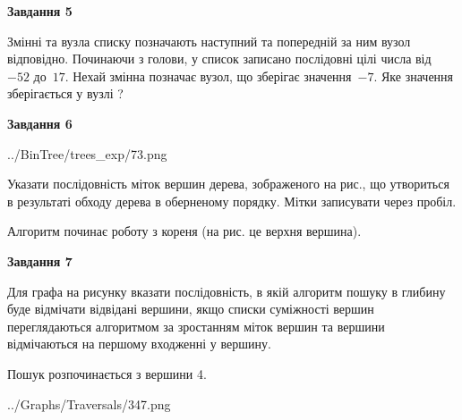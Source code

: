 \documentclass[12pt, ukrainian]{article}
\begin{document}
{\begin {large}
{\begin {center}\textbf{Завдання 5}\end {center}}\par
Змінні  та  вузла списку позначають наступний та попередній за ним вузол відповідно. Починаючи з голови, у список записано послідовні цілі числа від~$-52$ до~$17$. Нехай змінна  позначає вузол, що зберігає значення~$-7$.
Яке значення зберігається у вузлі  ?\par
\newpage

{\begin {center}\textbf{Завдання 6}\end {center}}\par

\begin{center}
	{../BinTree/trees_exp/73.png}
\end{center}
Указати послідовність міток вершин дерева, зображеного на рис., що утвориться в результаті обходу дерева в оберненому порядку. Мітки записувати через пробіл.\par Алгоритм починає роботу з кореня (на рис. це верхня вершина).\par
\newpage

{\begin {center}\textbf{Завдання 7}\end {center}}\par
Для графа на рисунку вказати послідовність, в якій алгоритм пошуку в глибину буде відмічати відвідані вершини, якщо списки суміжності вершин переглядаються алгоритмом за зростанням міток вершин та вершини відмічаються на першому вход\-женні у вершину.\par
Пошук розпочинається з вершини 4.\par

\begin{center}
	{../Graphs/Traversals/347.png}
\end{center}\par
\newpage


\end{large}}
\end{document}
